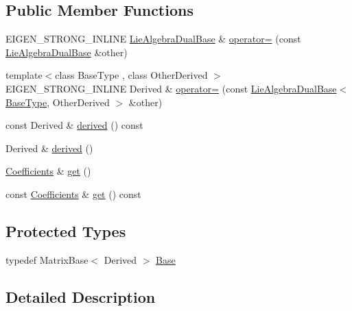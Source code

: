 \subsection*{Public Member Functions}
\begin{DoxyCompactItemize}
\item 
E\+I\+G\+E\+N\+\_\+\+S\+T\+R\+O\+N\+G\+\_\+\+I\+N\+L\+I\+NE \hyperlink{class_lie_algebra_dual_base}{Lie\+Algebra\+Dual\+Base} \& \hyperlink{class_lie_algebra_dual_base_a849c6b62c74363de84a0979ca7ed42ec}{operator=} (const \hyperlink{class_lie_algebra_dual_base}{Lie\+Algebra\+Dual\+Base} \&other)
\item 
{\footnotesize template$<$class Base\+Type , class Other\+Derived $>$ }\\E\+I\+G\+E\+N\+\_\+\+S\+T\+R\+O\+N\+G\+\_\+\+I\+N\+L\+I\+NE Derived \& \hyperlink{class_lie_algebra_dual_base_afade5fdd0a47c9651ac3f5da3b957279}{operator=} (const \hyperlink{class_lie_algebra_dual_base}{Lie\+Algebra\+Dual\+Base}$<$ \hyperlink{class_lie_algebra_dual_base_a1d0d10f7479bc0e235b13e29f1c012d2}{Base\+Type}, Other\+Derived $>$ \&other)
\item 
const Derived \& \hyperlink{class_lie_algebra_dual_base_a7d3f98b2b7516cbd7d86d756de8fa486}{derived} () const
\item 
Derived \& \hyperlink{class_lie_algebra_dual_base_a76d6c80a3a3877e11a793ac466cd14c5}{derived} ()
\item 
\hyperlink{class_lie_algebra_dual_base_a9cbdf57fdc61d9ff457e9a9a814f5fdd}{Coefficients} \& \hyperlink{class_lie_algebra_dual_base_a63e4b601677da3bdce780471e4b9ad56}{get} ()
\item 
const \hyperlink{class_lie_algebra_dual_base_a9cbdf57fdc61d9ff457e9a9a814f5fdd}{Coefficients} \& \hyperlink{class_lie_algebra_dual_base_ae03f2f8180d4da63190a6e2407349695}{get} () const
\end{DoxyCompactItemize}
\subsection*{Protected Types}
\begin{DoxyCompactItemize}
\item 
typedef Matrix\+Base$<$ Derived $>$ \hyperlink{class_lie_algebra_dual_base_aefad5adecf2973bcc85a83015c111faf}{Base}
\end{DoxyCompactItemize}


\subsection{Detailed Description}
